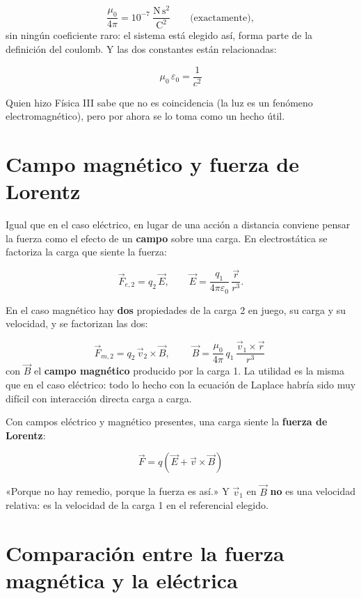 \documentclass[12pt,a4paper]{article}
\begin{document}
\[
\frac{\mu_0}{4\pi} = 10^{-7}\ \frac{\text{N}\,\text{s}^2}{\text{C}^2}
\qquad\text{(exactamente)},
\]
sin ningún coeficiente raro: el sistema está elegido así, forma parte de la
definición del coulomb. Y las dos constantes están relacionadas:

\begin{keybox}
\[
\boxed{\ \mu_0\,\varepsilon_0 = \frac{1}{c^2}\ }
\]
\end{keybox}

Quien hizo Física III sabe que no es coincidencia (la luz es un fenómeno
electromagnético), pero por ahora se lo toma como un hecho útil.

\section{Campo magnético y fuerza de Lorentz}

Igual que en el caso eléctrico, en lugar de una acción a distancia conviene
pensar la fuerza como el efecto de un \textbf{campo} sobre una carga. En
electrostática se factoriza la carga que siente la fuerza:

\[
\vec F_{e,2} = q_2\,\vec E, \qquad
\vec E = \frac{q_1}{4\pi\varepsilon_0}\,\frac{\vec r}{r^3} .
\]

En el caso magnético hay \textbf{dos} propiedades de la carga 2 en juego, su carga y
su velocidad, y se factorizan las dos:

\[
\vec F_{m,2} = q_2\,\vec v_2\times\vec B,
\qquad
\boxed{\ \vec B = \frac{\mu_0}{4\pi}\,q_1\,\frac{\vec v_1\times\vec r}{r^3}\ }
\]
con $\vec B$ el \textbf{campo magnético} producido por la carga 1. La utilidad es la
misma que en el caso eléctrico: todo lo hecho con la ecuación de Laplace habría
sido muy difícil con interacción directa carga a carga.

Con campos eléctrico y magnético presentes, una carga siente la \textbf{fuerza de
Lorentz}:

\begin{keybox}
\[
\boxed{\ \vec F = q\left(\vec E + \vec v\times\vec B\right)\ }
\]
\end{keybox}

\begin{notebox}
«Porque no hay remedio, porque la fuerza
es así.» Y $\vec v_1$ en $\vec B$ \textbf{no} es una velocidad relativa: es la
velocidad de la carga 1 en el referencial elegido.
\end{notebox}

\section{Comparación entre la fuerza magnética y la eléctrica}
\end{document}

